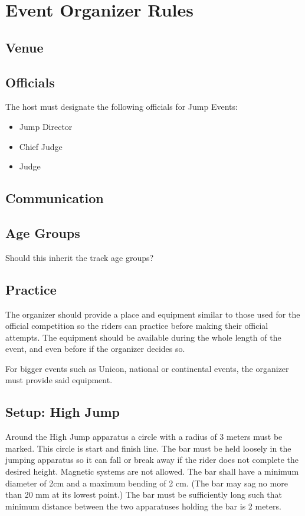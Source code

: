\chapter{Event Organizer Rules}

\section{Venue}

\section{Officials}

The host must designate the following officials for Jump Events:
\begin{itemize}
\item Jump Director
\item Chief Judge
\item Judge
\end{itemize}

\begin{comment-2016}
\section{Communication}
\end{comment-2016}


\begin{comment-2016}
\section{Age Groups}

Should this inherit the track age groups?
\end{comment-2016}

\section{Practice}

The organizer should provide a place and equipment similar to those used for the official competition so the riders can practice before making their official attempts.
The equipment should be available during the whole length of the event, and even before if the organizer decides so.

For bigger events such as Unicon, national or continental events, the organizer must provide said equipment.

\section{Setup: High Jump}
Around the High Jump apparatus a circle with a radius of 3 meters must be marked.
This circle is start and finish line.
The bar must be held loosely in the jumping apparatus so it can fall or break away if the rider does not complete the desired height.
Magnetic systems are not allowed.
The bar shall have a minimum diameter of 2cm and a maximum bending of 2 cm.
(The bar may sag no more than 20 mm at its lowest point.)
The bar must be sufficiently long such that minimum distance between the two apparatuses holding the bar is 2 meters.


